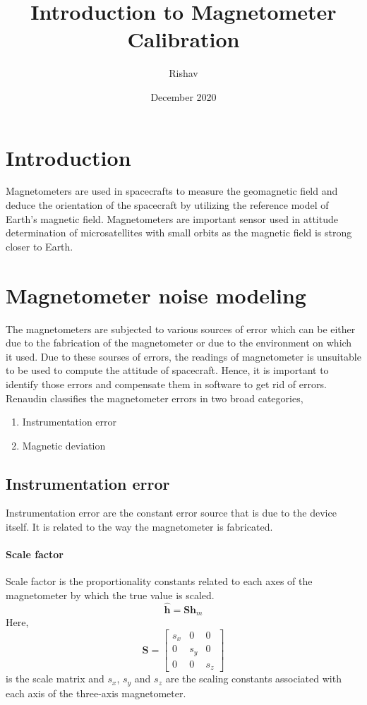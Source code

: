 \documentclass[10pt, a4paper]{article}
\title{Introduction to Magnetometer Calibration}
\author{Rishav}
\date{December 2020}
\begin{document}
\maketitle

\section{Introduction}
Magnetometers are used in spacecrafts to measure the geomagnetic field and deduce the orientation of the spacecraft by utilizing the reference model of Earth's magnetic field. Magnetometers are important sensor used in attitude determination of microsatellites with small orbits as the magnetic field is strong closer to Earth.

\section{Magnetometer noise modeling}
The magnetometers are subjected to various sources of error which can be either due to the fabrication of the magnetometer or due to the environment on which it used. Due to these sourses of errors, the readings of magnetometer is unsuitable to be used to compute the attitude of spacecraft. Hence, it is important to identify those errors and compensate them in software to get rid of errors. Renaudin classifies the magnetometer errors in two broad categories,
\begin{enumerate}
\item Instrumentation error
\item Magnetic deviation
\end{enumerate}

\subsection{Instrumentation error}
Instrumentation error are the constant error source that is due to the device itself. It is related to the way the magnetometer is fabricated.

\paragraph*{Scale factor} \label{equ_mg_scale}
Scale factor is the proportionality constants related to each axes of the magnetometer by which the true value is scaled.
\begin{equation}
\hat{\bm{h}} = \bm{S} \bm{h}_{m}  
\end{equation}
 Here, $$\bm{S} = \begin{bmatrix} s_{x} & 0 & 0 \\ 0  & s_{y} & 0  \\ 0 & 0 & s_{z} \end{bmatrix} $$ is the scale matrix and $s_{x}$, $s_{y}$ and $s_{z}$ are the scaling constants associated with each axis of the three-axis magnetometer.
\end{document}

